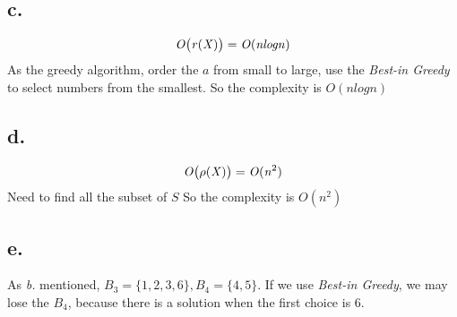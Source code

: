 \documentclass{article}
\begin{document}
{    \subsection*{c.}{
        \[\mathit{O\big{(}r(X)\big{)}=O(n log n)}\]
        As the greedy algorithm, order the \(\mathit{a}\) from small to large, use the \textit{Best-in Greedy} to select numbers from the smallest. So the complexity is \(\mathit{O(n log n)}\)
    }
    \subsection*{d.}{
        \[\mathit{O\big{(}\rho(X)\big{)}=O(n^{\mathrm{2}})}\]
        Need to find all the subset of \(\mathit{S}\) So the complexity is \(\mathit{O(n^2)}\)
    }
    \subsection*{e.}{
        As \textit{b.} mentioned, \(\mathit{B}_{\mathrm{3}}=\mathrm{\{1,2,3,6\}},\mathit{B}_{\mathrm{4}}=\mathrm{\{4,5\}}\). If we use \textit{Best-in Greedy}, we may lose the \(\mathit{B}_{\mathrm{4}}\), because there is a solution when the first choice is 6. 
    }
}
\end{document}
